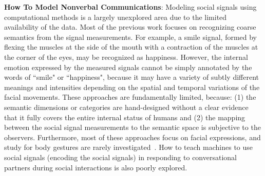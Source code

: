 \noindent \textbf{How To Model Nonverbal Communications}: 
Modeling social signals using computational methods is a largely unexplored area due to the limited availability of the data. Most of the previous work focuses on recognizing coarse semantics from the signal measurements\cite{ekman1969, osgood1952nature, russell1979affective, plutchik2001nature}. For example, a smile signal, formed by flexing the muscles at the side of the mouth with a contraction of the muscles at the corner of the eyes, may be recognized as happiness. However, the internal emotion expressed by the measured signals cannot be simply annotated by the words of ``smile" or ``happiness", because it may have a variety of subtly different meanings and intensities depending on the spatial and temporal variations of the facial movements. These approaches are fundamentally limited, because: (1) the semantic dimensions or categories are hand-designed without a clear evidence that it fully covers the entire internal status of humans and (2) the mapping between the social signal measurements to the semantic space is subjective to the observers. Furthermore, most of these approaches focus on facial expressions, and study for body gestures are rarely investigated~\cite{gunes2006bimodal, banziger2012introducing, de2004modeling}. How to teach machines to use social signals (encoding the social signals) in responding to conversational partners during social interactions is also poorly explored.

